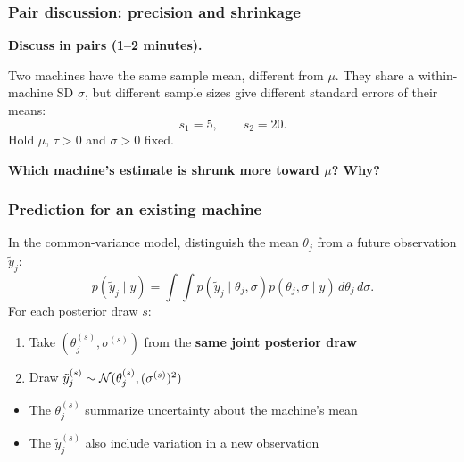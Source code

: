\documentclass[10pt]{beamer}
\begin{document}
\begin{frame}
\frametitle{Pair discussion: precision and shrinkage}

  {\color{uured}\textbf{Discuss in pairs (1--2 minutes).}}

  Two machines have the same sample mean, different from $\mu$.
  They share a within-machine SD $\sigma$, but different sample sizes
  give different standard errors of their means:
  \[
    s_1=5,\qquad s_2=20.
  \]
  Hold $\mu$, $\tau>0$ and $\sigma>0$ fixed.

  \textbf{Which machine's estimate is shrunk more toward $\mu$? Why?}

\end{frame}

\begin{frame}
\frametitle{Prediction for an existing machine}

  In the common-variance model, distinguish the mean $\theta_j$
  from a future observation $\tilde y_j$:
  \[
    p(\tilde y_j\mid y)=\int\!\int
      p(\tilde y_j\mid\theta_j,\sigma)
      p(\theta_j,\sigma\mid y)\,d\theta_j\,d\sigma.
  \]
  For each posterior draw $s$:
  \begin{enumerate}
  \item Take $(\theta_j^{(s)},\sigma^{(s)})$ from the
    \textbf{same joint posterior draw}
  \item Draw $\tilde y_j^{(s)}\sim
    \mathcal{N}(\theta_j^{(s)},(\sigma^{(s)})^2)$
  \end{enumerate}
  \begin{itemize}
  \item The $\theta_j^{(s)}$ summarize uncertainty about the machine's mean
  \item The $\tilde y_j^{(s)}$ also include variation in a new observation
  \end{itemize}
\end{frame}
\end{document}

